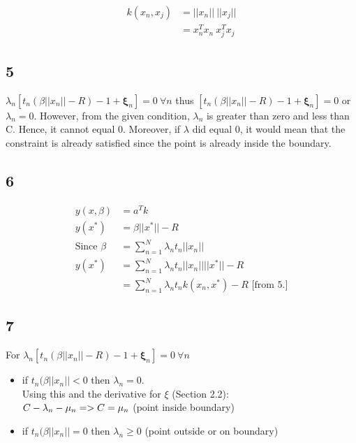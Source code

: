 \documentclass[a4paper]{article}
\begin{document}
\begin{align*}
    k(x_{n}, x_{j}) &= ||x_{n}||\ ||x_{j}||\\
    &= x_{n}^{T}x_{n} \ x^{T}_{j}x_{j}
\end{align*}

\subsection*{5}
$\lambda_{n}[t_{n}(\beta||x_{n}|| - R) - 1 + \pmb{\xi}_{n}] = 0  \ \forall n$ thus $[t_{n}(\beta||x_{n}|| - R) - 1 + \pmb{\xi}_{n}] = 0$ or $\lambda_{n} = 0$. However, from the given condition, $\lambda_{n}$ is greater than zero and less than C. Hence, it cannot equal 0. Moreover, if $\lambda$ did equal 0, it would mean that the constraint is already satisfied since the point is already inside the boundary. 

\subsection*{6}
\begin{align}
    y(x, \beta) &= a^{T}k \\
    y(x^{*})&= \beta||x^{*}|| - R \\
    \text{Since } \beta &= \sum_{n=1}^{N}\lambda_{n}t_{n}||x_{n}|| \\
    y(x^{*}) &= \sum_{n=1}^{N}\lambda_{n}t_{n}||x_{n}||||x^{*}|| - R \\
    &= \sum_{n=1}^{N}\lambda_{n}t_{n}k(x_{n},x^{*}) - R  \text{  \ \ \ \  [from 5.]}
\end{align}

\subsection*{7}

For $\lambda_{n}[t_{n}(\beta||x_{n}|| - R) - 1 + \pmb{\xi}_{n}] = 0  \ \forall n$ \\
\begin{itemize}
    \item if $t_{n}(\beta||x_{n}|| < 0$ then $\lambda_{n} = 0$. \\ Using this and the derivative for $\xi$ (Section 2.2): \\
    $C - \lambda_{n} - \mu_{n} => \\
    C =  \mu_{n} $ (point inside boundary)
    \item if $t_{n}(\beta||x_{n}|| = 0$ then $\lambda_{n} \geq 0$ (point outside or on boundary)
\end{itemize}
\end{document}
